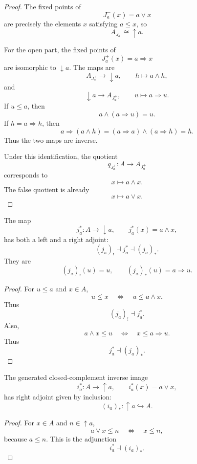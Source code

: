 \begin{proof}
The fixed points of
\[
    J_a^-(x)=a\vee x
\]
are precisely the elements \(x\) satisfying \(a\leq x\), so
\[
    A_{J_a^-}\cong\uparrow a.
\]

For the open part, the fixed points of
\[
    J_a^+(x)=a\Rightarrow x
\]
are isomorphic to \(\downarrow a\).  The maps are
\[
    A_{J_a^+}\to\downarrow a,
    \qquad
    h\longmapsto a\wedge h,
\]
and
\[
    \downarrow a\to A_{J_a^+},
    \qquad
    u\longmapsto a\Rightarrow u.
\]
If \(u\leq a\), then
\[
    a\wedge(a\Rightarrow u)=u.
\]
If \(h=a\Rightarrow h\), then
\[
    a\Rightarrow(a\wedge h)
    =
    (a\Rightarrow a)\wedge(a\Rightarrow h)
    =
    h.
\]
Thus the two maps are inverse.

Under this identification, the quotient
\[
    q_{J_a^+}:A\to A_{J_a^+}
\]
corresponds to
\[
    x\longmapsto a\wedge x.
\]
The false quotient is already
\[
    x\longmapsto a\vee x.
\]
\end{proof}

\begin{proposition}
\label{prop:idempotent-open-adjoints}
The map
\[
    j_a^\ast:A\to\downarrow a,
    \qquad
    j_a^\ast(x)=a\wedge x,
\]
has both a left and a right adjoint:
\[
    (j_a)_!\dashv j_a^\ast\dashv(j_a)_\ast.
\]
They are
\[
    (j_a)_!(u)=u,
    \qquad
    (j_a)_\ast(u)=a\Rightarrow u.
\]
\end{proposition}

\begin{proof}
For \(u\leq a\) and \(x\in A\),
\[
    u\leq x
    \quad\Longleftrightarrow\quad
    u\leq a\wedge x.
\]
Thus
\[
    (j_a)_!\dashv j_a^\ast.
\]
Also,
\[
    a\wedge x\leq u
    \quad\Longleftrightarrow\quad
    x\leq a\Rightarrow u.
\]
Thus
\[
    j_a^\ast\dashv(j_a)_\ast.
\]
\end{proof}

\begin{proposition}
\label{prop:idempotent-closed-adjoint}
The generated closed-complement inverse image
\[
    i_a^\ast:A\to\uparrow a,
    \qquad
    i_a^\ast(x)=a\vee x,
\]
has right adjoint given by inclusion:
\[
    (i_a)_\ast:\uparrow a\hookrightarrow A.
\]
\end{proposition}

\begin{proof}
For \(x\in A\) and \(n\in\uparrow a\),
\[
    a\vee x\leq n
    \quad\Longleftrightarrow\quad
    x\leq n,
\]
because \(a\leq n\).  This is the adjunction
\[
    i_a^\ast\dashv(i_a)_\ast.
\]
\end{proof}

